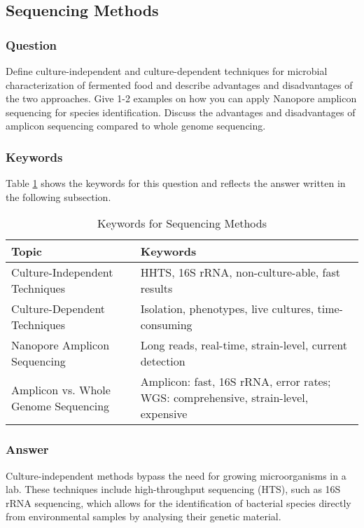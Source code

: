 \subsection{Sequencing Methods}
\subsubsection*{Question}
Define culture-independent and culture-dependent techniques for microbial characterization of fermented food and describe advantages and disadvantages of the two approaches. Give 1-2 examples on how you can apply Nanopore amplicon sequencing for species identification. Discuss the advantages and disadvantages of amplicon sequencing compared to whole genome sequencing. 

\subsubsection*{Keywords}
Table \ref{tab:KW-Sequencing} shows the keywords for this question and reflects the answer written in the following subsection.
\begin{table}[h]
    \centering
    \caption{Keywords for Sequencing Methods} 
    \label{tab:KW-Sequencing}
    \begin{tabularx}{\textwidth}{l|X}
        \textbf{Topic} & \textbf{Keywords} \\
        \hline
        Culture-Independent Techniques & HHTS, 16S rRNA, non-culture-able, fast results \\

        Culture-Dependent Techniques & Isolation, phenotypes, live cultures, time-consuming \\

        Nanopore Amplicon Sequencing & Long reads, real-time, strain-level, current detection \\

        Amplicon vs. Whole Genome Sequencing & Amplicon: fast, 16S rRNA, error rates; WGS: comprehensive, strain-level, expensive \\
    \end{tabularx}
\end{table}

\subsubsection*{Answer}
Culture-independent methods bypass the need for growing microorganisms in a lab. These techniques include high-throughput sequencing (HTS), such as 16S rRNA sequencing, which allows for the identification of bacterial species directly from environmental samples by analysing their genetic material.

